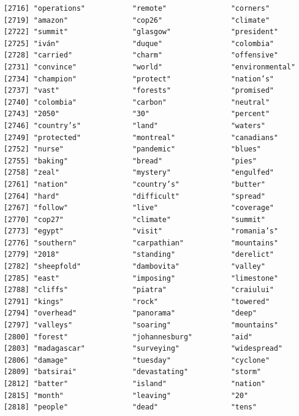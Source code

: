\documentclass[
  letterpaper,
  DIV=11,
  numbers=noendperiod]{scrartcl}
\begin{document}
\begin{verbatim}
[2716] "operations"           "remote"               "corners"             
[2719] "amazon"               "cop26"                "climate"             
[2722] "summit"               "glasgow"              "president"           
[2725] "iván"                 "duque"                "colombia"            
[2728] "carried"              "charm"                "offensive"           
[2731] "convince"             "world"                "environmental"       
[2734] "champion"             "protect"              "nation’s"            
[2737] "vast"                 "forests"              "promised"            
[2740] "colombia"             "carbon"               "neutral"             
[2743] "2050"                 "30"                   "percent"             
[2746] "country’s"            "land"                 "waters"              
[2749] "protected"            "montreal"             "canadians"           
[2752] "nurse"                "pandemic"             "blues"               
[2755] "baking"               "bread"                "pies"                
[2758] "zeal"                 "mystery"              "engulfed"            
[2761] "nation"               "country’s"            "butter"              
[2764] "hard"                 "difficult"            "spread"              
[2767] "follow"               "live"                 "coverage"            
[2770] "cop27"                "climate"              "summit"              
[2773] "egypt"                "visit"                "romania’s"           
[2776] "southern"             "carpathian"           "mountains"           
[2779] "2018"                 "standing"             "derelict"            
[2782] "sheepfold"            "dambovita"            "valley"              
[2785] "east"                 "imposing"             "limestone"           
[2788] "cliffs"               "piatra"               "craiului"            
[2791] "kings"                "rock"                 "towered"             
[2794] "overhead"             "panorama"             "deep"                
[2797] "valleys"              "soaring"              "mountains"           
[2800] "forest"               "johannesburg"         "aid"                 
[2803] "madagascar"           "surveying"            "widespread"          
[2806] "damage"               "tuesday"              "cyclone"             
[2809] "batsirai"             "devastating"          "storm"               
[2812] "batter"               "island"               "nation"              
[2815] "month"                "leaving"              "20"                  
[2818] "people"               "dead"                 "tens"                

\end{verbatim}
\end{document}
